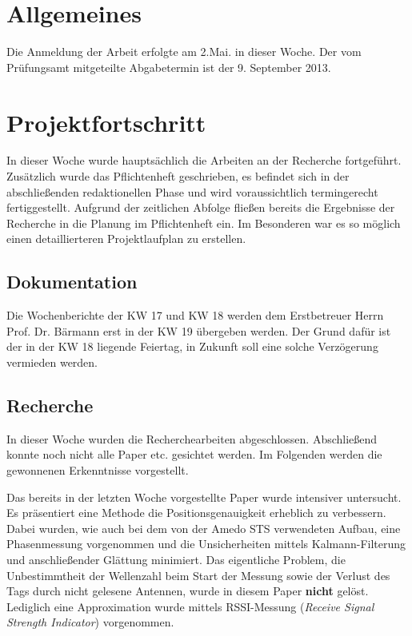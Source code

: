 \documentclass[a4paper,12pt,fleqn]{scrartcl}
\begin{document}
\setlength{\headheight}{36pt}

\begin{titlepage}



\end{titlepage}

\section[Allgemeines]{Allgemeines}
Die Anmeldung der Arbeit erfolgte am 2.Mai. in dieser Woche. Der vom Prüfungsamt mitgeteilte Abgabetermin ist der 9. September 2013.

\section[Fortschritt]{Projektfortschritt}
In dieser Woche wurde hauptsächlich die Arbeiten an der Recherche fortgeführt. Zusätzlich wurde das Pflichtenheft geschrieben, es befindet sich in der abschließenden redaktionellen Phase und wird voraussichtlich termingerecht fertiggestellt. Aufgrund der zeitlichen Abfolge fließen bereits die Ergebnisse der Recherche in die Planung im Pflichtenheft ein. Im Besonderen war es so möglich einen detaillierteren Projektlaufplan zu erstellen.

\subsection{Dokumentation}
Die Wochenberichte der KW 17 und KW 18 werden dem Erstbetreuer Herrn Prof. Dr. Bärmann erst in der KW 19 übergeben werden. Der Grund dafür ist der in der KW 18 liegende Feiertag, in Zukunft soll eine solche Verzögerung vermieden werden.

\subsection{Recherche}
In dieser Woche wurden die Recherchearbeiten abgeschlossen. Abschließend konnte noch nicht alle Paper etc. gesichtet werden. Im Folgenden werden die gewonnenen Erkenntnisse vorgestellt.

Das bereits in der letzten Woche vorgestellte Paper \cite{KALMANandSMOOTHING} wurde intensiver untersucht. Es präsentiert eine Methode die Positionsgenauigkeit erheblich zu verbessern. Dabei wurden, wie auch bei dem von der Amedo STS verwendeten Aufbau, eine Phasenmessung vorgenommen und die Unsicherheiten mittels Kalmann-Filterung und anschließender Glättung minimiert. Das eigentliche Problem, die Unbestimmtheit der Wellenzahl beim Start der Messung sowie der Verlust des Tags durch nicht gelesene Antennen, wurde in diesem Paper \textbf{nicht} gelöst. Lediglich eine Approximation wurde mittels RSSI-Messung (\textit{Receive Signal Strength Indicator}) vorgenommen.
\end{document}
